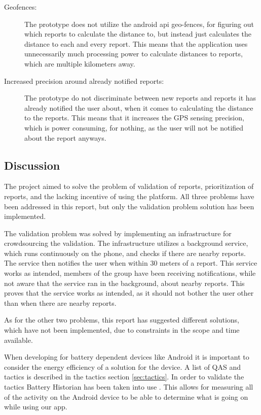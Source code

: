\begin{description}
\item [Geofences:] The prototype does not utilize the android api geo-fences, for figuring out which reports to calculate the distance to, but instead just calculates the distance to each and every report. This means that the application uses unnecessarily much processing power to calculate distances to reports, which are multiple kilometers away.
\item [Increased precision around already notified reports:] The prototype do not discriminate between new reports and reports it has already notified the user about, when it comes to calculating the distance to the reports. This means that it increases the GPS sensing precision, which is power consuming, for nothing, as the user will not be notified about the report anyways.
\end{description}

\subsection{Discussion}

The project aimed to solve the problem of validation of reports, prioritization of reports, and the lacking incentive of using the platform. All three problems have been addressed in this report, but only the validation problem solution has been implemented.

The validation problem was solved by implementing an infrastructure for crowdsourcing the validation. The infrastructure utilizes a background service, which runs continuously on the phone, and checks if there are nearby reports. The service then notifies the user when within 30 meters of a report. 
This service works as intended, members of the group have been receiving notifications, while not aware that the service ran in the background, about nearby reports. This proves that the service works as intended, as it should not bother the user other than when there are nearby reports.

As for the other two problems, this report has suggested different solutions, which have not been implemented, due to constraints in the scope and time available.

When developing for battery dependent devices like Android it is important to consider the energy efficiency of a solution for the device. A list of QAS and tactics is described in the tactics section \ref{sec:tactics}. In order to validate the tactics Battery Historian has been taken into use \cite{bathist}. This allows for measuring all of the activity on the Android device to be able to determine what is going on while using our app. 


